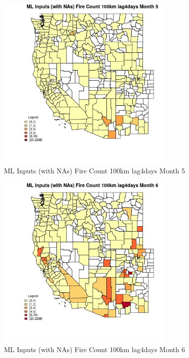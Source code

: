 \clearpage 

\begin{figure} 
\centering  
\includegraphics[width=0.77\textwidth]{Code_Outputs/Report_ML_input_PM25_Step4_part_e_de_duplicated_aves_compiled_2019-05-20wNAs_CountyFire_Count_100km_lag4daysmedianMonth5.jpg} 
\caption{\label{fig:Report_ML_input_PM25_Step4_part_e_de_duplicated_aves_compiled_2019-05-20wNAsCountyFire_Count_100km_lag4daysmedianMonth5}ML Inputs (with NAs) Fire Count 100km lag4days Month 5} 
\end{figure} 
 

\begin{figure} 
\centering  
\includegraphics[width=0.77\textwidth]{Code_Outputs/Report_ML_input_PM25_Step4_part_e_de_duplicated_aves_compiled_2019-05-20wNAs_CountyFire_Count_100km_lag4daysmedianMonth6.jpg} 
\caption{\label{fig:Report_ML_input_PM25_Step4_part_e_de_duplicated_aves_compiled_2019-05-20wNAsCountyFire_Count_100km_lag4daysmedianMonth6}ML Inputs (with NAs) Fire Count 100km lag4days Month 6} 
\end{figure} 
 

